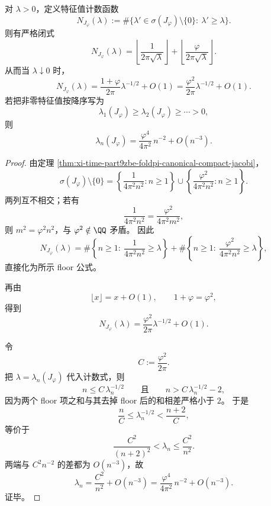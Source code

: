 \begin{theorem}\label{thm:xi-time-part9zbe-foldpi-jacobi-counting-weyl}
对 \(\lambda>0\)，定义特征值计数函数
\[
N_{J_\varphi}(\lambda)
:=
\#\bigl\{\lambda'\in \sigma(J_\varphi)\setminus\{0\}:\ \lambda'\ge \lambda\bigr\}.
\]
则有严格闭式
\[
N_{J_\varphi}(\lambda)
=
\left\lfloor \frac{1}{2\pi\sqrt{\lambda}}\right\rfloor
+
\left\lfloor \frac{\varphi}{2\pi\sqrt{\lambda}}\right\rfloor.
\]
从而当 \(\lambda\downarrow 0\) 时，
\[
N_{J_\varphi}(\lambda)
=
\frac{1+\varphi}{2\pi}\lambda^{-1/2}+O(1)
=
\frac{\varphi^2}{2\pi}\lambda^{-1/2}+O(1).
\]
若把非零特征值按降序写为
\[
\lambda_1(J_\varphi)\ge \lambda_2(J_\varphi)\ge \cdots >0,
\]
则
\[
\lambda_n(J_\varphi)
=
\frac{\varphi^4}{4\pi^2}\,n^{-2}+O(n^{-3}).
\]
\end{theorem}
\begin{proof}
由定理 \ref{thm:xi-time-part9zbe-foldpi-canonical-compact-jacobi}，
\[
\sigma(J_\varphi)\setminus\{0\}
=
\left\{\frac{1}{4\pi^2n^2}:n\ge 1\right\}
\cup
\left\{\frac{\varphi^2}{4\pi^2n^2}:n\ge 1\right\}.
\]
两列互不相交；若有
\[
\frac{1}{4\pi^2n^2}=\frac{\varphi^2}{4\pi^2m^2},
\]
则 \(m^2=\varphi^2n^2\)，与 \(\varphi^2\notin\QQ\) 矛盾。
因此
\[
N_{J_\varphi}(\lambda)
=
\#\left\{n\ge 1:\ \frac{1}{4\pi^2n^2}\ge \lambda\right\}
+
\#\left\{n\ge 1:\ \frac{\varphi^2}{4\pi^2n^2}\ge \lambda\right\},
\]
直接化为所示 floor 公式。

再由
\[
\lfloor x\rfloor=x+O(1),
\qquad
1+\varphi=\varphi^2,
\]
得到
\[
N_{J_\varphi}(\lambda)
=
\frac{\varphi^2}{2\pi}\lambda^{-1/2}+O(1).
\]

令
\[
C:=\frac{\varphi^2}{2\pi}.
\]
把 \(\lambda=\lambda_n(J_\varphi)\) 代入计数式，则
\[
n\le C\,\lambda_n^{-1/2}
\qquad\text{且}\qquad
n>C\,\lambda_n^{-1/2}-2,
\]
因为两个 floor 项之和与其去掉 floor 后的和相差严格小于 \(2\)。
于是
\[
\frac{n}{C}\le \lambda_n^{-1/2}<\frac{n+2}{C},
\]
等价于
\[
\frac{C^2}{(n+2)^2}<\lambda_n\le \frac{C^2}{n^2}.
\]
两端与 \(C^2n^{-2}\) 的差都为 \(O(n^{-3})\)，故
\[
\lambda_n=\frac{C^2}{n^2}+O(n^{-3})
=
\frac{\varphi^4}{4\pi^2}\,n^{-2}+O(n^{-3}).
\]
证毕。
\end{proof}

